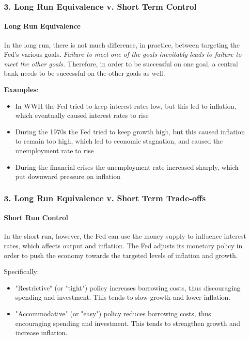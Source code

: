 \documentclass{beamer}
\begin{document}
\begin{frame}[t]
    \frametitle{3. Long Run Equivalence v. Short Term Control}
    \framesubtitle{Long Run Equivalence}

    In the long run, there is not much difference, in practice, between targeting the Fed's various goals.  \textit{Failure to meet one of the goals inevitably leads to failure to meet the other goals.}  Therefore, in order to be successful on one goal, a central bank needs to be successful on the other goals as well.
    \vspace{0.5em}
    
    \textbf{Examples}:
    \begin{itemize}
        \item In WWII the Fed tried to keep interest rates low, but this led to inflation, which eventually caused interest rates to rise
        \item During the 1970s the Fed tried to keep growth high, but this caused inflation to remain too high, which led to economic stagnation, and caused the unemployment rate to rise
        \item During the financial crises the unemployment rate increased sharply, which put downward pressure on inflation
    \end{itemize}

\end{frame}

\begin{frame}[t]
    \frametitle{3. Long Run Equivalence v. Short Term Trade-offs}
    \framesubtitle{Short Run Control}

    In the short run, however, the Fed can use the money supply to influence interest rates, which affects output and inflation.   The Fed adjusts its monetary policy in order to push the economy towards the targeted levels of inflation and growth. 
    \vspace{1em}
    
    Specifically:
    \begin{itemize}
        \item "Restrictive" (or "tight") policy increases borrowing costs, thus discouraging spending and investment.  This tends to slow growth and lower inflation.
        \item "Accommodative" (or "easy") policy reduces borrowing costs, thus encouraging spending and investment.  This tends to strengthen growth and increase inflation.
    \end{itemize}

\end{frame}
\end{document}
